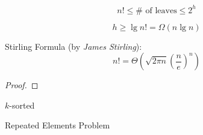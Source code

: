 \begin{frame}{}
  \begin{center}
    {\Large {}} 
  \end{center}

  \[
    \boxed{n! \le \# \text{ of leaves} \le 2^h}
  \]

  \pause
  \[
    h \ge \lg n! = \Omega(n \lg n)
  \]

  \pause
  \vspace{0.60cm}
  \begin{alertblock}{Stirling Formula (by {\it James Stirling}):}
    \[
      n! = \Theta(\sqrt{2 \pi n} \left(\frac{n}{e}\right)^{n})
    \]

    \begin{proof}
    \end{proof}
  \end{alertblock}
\end{frame}

\begin{frame}{}
  $k$-sorted 
\end{frame}

\begin{frame}{}
  Repeated Elements Problem
\end{frame}
